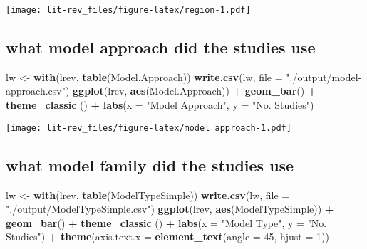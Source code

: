 \documentclass[
]{article}
\newenvironment{Shaded}{\begin{snugshade}}{\end{snugshade}}
\newcommand{\DataTypeTok}[1]{\textcolor[rgb]{0.13,0.29,0.53}{#1}}
\newcommand{\DecValTok}[1]{\textcolor[rgb]{0.00,0.00,0.81}{#1}}
\newcommand{\KeywordTok}[1]{\textcolor[rgb]{0.13,0.29,0.53}{\textbf{#1}}}
\newcommand{\NormalTok}[1]{#1}
\newcommand{\OperatorTok}[1]{\textcolor[rgb]{0.81,0.36,0.00}{\textbf{#1}}}
\newcommand{\StringTok}[1]{\textcolor[rgb]{0.31,0.60,0.02}{#1}}
\begin{document}
\texttt{[image: lit-rev\_files/figure-latex/region-1.pdf]}

\hypertarget{what-model-approach-did-the-studies-use}{%
\subsection{what model approach did the studies
use}\label{what-model-approach-did-the-studies-use}}

\begin{Shaded}
\begin{Highlighting}[]
\NormalTok{lw <-}\StringTok{ }\KeywordTok{with}\NormalTok{(lrev, }\KeywordTok{table}\NormalTok{(Model.Approach))}
\KeywordTok{write.csv}\NormalTok{(lw, }\DataTypeTok{file =} \StringTok{"./output/model-approach.csv"}\NormalTok{)}
\KeywordTok{ggplot}\NormalTok{(lrev, }\KeywordTok{aes}\NormalTok{(Model.Approach)) }\OperatorTok{+}\StringTok{ }\KeywordTok{geom_bar}\NormalTok{() }\OperatorTok{+}\StringTok{ }\KeywordTok{theme_classic}\NormalTok{ () }\OperatorTok{+}\StringTok{ }\KeywordTok{labs}\NormalTok{(}\DataTypeTok{x =} \StringTok{"Model Approach"}\NormalTok{, }\DataTypeTok{y =} \StringTok{"No. Studies"}\NormalTok{)}
\end{Highlighting}
\end{Shaded}

\texttt{[image: lit-rev\_files/figure-latex/model approach-1.pdf]}

\hypertarget{what-model-family-did-the-studies-use}{%
\subsection{what model family did the studies
use}\label{what-model-family-did-the-studies-use}}

\begin{Shaded}
\begin{Highlighting}[]
\NormalTok{lw <-}\StringTok{ }\KeywordTok{with}\NormalTok{(lrev, }\KeywordTok{table}\NormalTok{(ModelTypeSimple))}
\KeywordTok{write.csv}\NormalTok{(lw, }\DataTypeTok{file =} \StringTok{"./output/ModelTypeSimple.csv"}\NormalTok{)}
\KeywordTok{ggplot}\NormalTok{(lrev, }\KeywordTok{aes}\NormalTok{(ModelTypeSimple)) }\OperatorTok{+}\StringTok{ }\KeywordTok{geom_bar}\NormalTok{() }\OperatorTok{+}\StringTok{ }\KeywordTok{theme_classic}\NormalTok{ () }\OperatorTok{+}\StringTok{ }\KeywordTok{labs}\NormalTok{(}\DataTypeTok{x =} \StringTok{"Model Type"}\NormalTok{, }\DataTypeTok{y =} \StringTok{"No. Studies"}\NormalTok{) }\OperatorTok{+}\StringTok{ }\KeywordTok{theme}\NormalTok{(}\DataTypeTok{axis.text.x =} \KeywordTok{element_text}\NormalTok{(}\DataTypeTok{angle =} \DecValTok{45}\NormalTok{, }\DataTypeTok{hjust =} \DecValTok{1}\NormalTok{))}
\end{Highlighting}
\end{Shaded}
\end{document}
